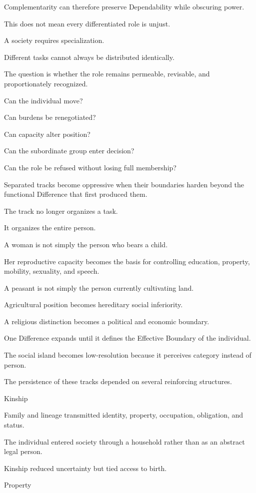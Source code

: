 Complementarity can therefore preserve Dependability while obscuring power.

This does not mean every differentiated role is unjust.

A society requires specialization.

Different tasks cannot always be distributed identically.

The question is whether the role remains permeable, revisable, and proportionately recognized.

Can the individual move?

Can burdens be renegotiated?

Can capacity alter position?

Can the subordinate group enter decision?

Can the role be refused without losing full membership?

Separated tracks become oppressive when their boundaries harden beyond the functional Difference that first produced them.

The track no longer organizes a task.

It organizes the entire person.

A woman is not simply the person who bears a child.

Her reproductive capacity becomes the basis for controlling education, property, mobility, sexuality, and speech.

A peasant is not simply the person currently cultivating land.

Agricultural position becomes hereditary social inferiority.

A religious distinction becomes a political and economic boundary.

One Difference expands until it defines the Effective Boundary of the individual.

The social island becomes low-resolution because it perceives category instead of person.

The persistence of these tracks depended on several reinforcing structures.

Kinship

Family and lineage transmitted identity, property, occupation, obligation, and status.

The individual entered society through a household rather than as an abstract legal person.

Kinship reduced uncertainty but tied access to birth.

Property

